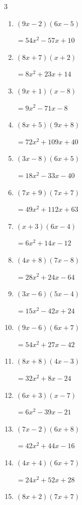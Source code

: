 \begin{multicols}{3}
\begin{enumerate}
        $=6x^{2}-35x+36$

\columnbreak %

  \item $(9x-2)(6x-5)$

        $=54x^{2}-57x+10$

  \item $(8x+7)(x+2)$

        $=8x^{2}+23x+14$

  \item $(9x+1)(x-8)$

        $=9x^{2}-71x-8$

  \item $(8x+5)(9x+8)$

        $=72x^{2}+109x+40$

  \item $(3x-8)(6x+5)$

        $=18x^{2}-33x-40$

  \item $(7x+9)(7x+7)$

        $=49x^{2}+112x+63$

  \item $(x+3)(6x-4)$

        $=6x^{2}+14x-12$

  \item $(4x+8)(7x-8)$

        $=28x^{2}+24x-64$

  \item $(3x-6)(5x-4)$

        $=15x^{2}-42x+24$

  \item $(9x-6)(6x+7)$

        $=54x^{2}+27x-42$

  \item $(8x+8)(4x-3)$

        $=32x^{2}+8x-24$

  \item $(6x+3)(x-7)$

        $=6x^{2}-39x-21$

  \item $(7x-2)(6x+8)$

        $=42x^{2}+44x-16$

  \item $(4x+4)(6x+7)$

        $=24x^{2}+52x+28$

  \item $(8x+2)(7x+7)$


\end{enumerate}
\end{multicols}
